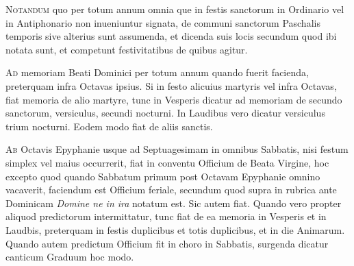 \begin{multicols*}{2}
{\color{Red} }
\lettrine[lines=2]{\zallmancaps \color{Blue} N}{otandum} quo per totum annum omnia que in festis sanctorum in Ordinario vel in Antiphonario non inueniuntur signata, de communi sanctorum Paschalis temporis sive alterius sunt assumenda, et dicenda suis locis secundum quod ibi notata sunt, et competunt festivitatibus de quibus agitur.



\lettrine[lines=1]{\zallmancaps \color{Blue} A}{d} memoriam Beati Dominici per totum annum quando fuerit facienda, preterquam infra Octavas ipsius.
Si in festo alicuius martyris vel infra Octavas, fiat memoria de alio martyre, tunc in Vesperis dicatur ad memoriam de secundo sanctorum, versiculus, secundi nocturni. In Laudibus vero dicatur versiculus trium nocturni. Eodem modo fiat de aliis sanctis.

\lettrine[lines=2]{\zallmancaps \color{Blue} A}{b} Octavis Epyphanie usque ad Septuagesimam in omnibus Sabbatis, nisi festum simplex vel maius occurrerit, fiat in conventu Officium de Beata Virgine, hoc excepto quod quando Sabbatum primum post Octavam Epyphanie omnino vacaverit, faciendum est Officium feriale, secundum quod supra in rubrica ante Dominicam \textit{Domine ne in ira} notatum est. Sic autem fiat.
Quando vero propter aliquod predictorum intermittatur, tunc fiat de ea memoria in Vesperis et in Laudbis, preterquam in festis duplicibus et totis duplicibus, et in die Animarum.
Quando autem predictum Officium fit in choro in Sabbatis, surgenda dicatur canticum Graduum hoc modo.


\end{multicols*}
